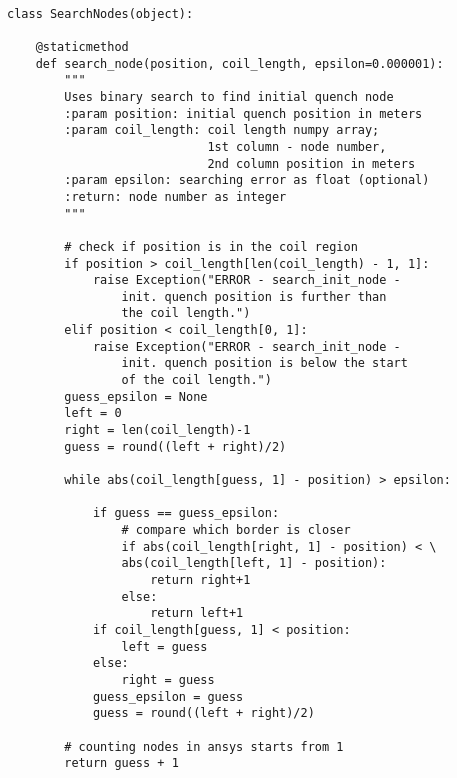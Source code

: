 
\begin{verbatim}
   
class SearchNodes(object):

    @staticmethod
    def search_node(position, coil_length, epsilon=0.000001):
        """
        Uses binary search to find initial quench node
        :param position: initial quench position in meters
        :param coil_length: coil length numpy array; 
                            1st column - node number, 
                            2nd column position in meters
        :param epsilon: searching error as float (optional)
        :return: node number as integer
        """
        
        # check if position is in the coil region
        if position > coil_length[len(coil_length) - 1, 1]:
            raise Exception("ERROR - search_init_node - 
                init. quench position is further than 
                the coil length.")
        elif position < coil_length[0, 1]:
            raise Exception("ERROR - search_init_node - 
                init. quench position is below the start 
                of the coil length.")
        guess_epsilon = None
        left = 0
        right = len(coil_length)-1
        guess = round((left + right)/2)
        
        while abs(coil_length[guess, 1] - position) > epsilon:
        
            if guess == guess_epsilon:
                # compare which border is closer
                if abs(coil_length[right, 1] - position) < \
                abs(coil_length[left, 1] - position):
                    return right+1
                else:
                    return left+1
            if coil_length[guess, 1] < position:
                left = guess
            else:
                right = guess
            guess_epsilon = guess
            guess = round((left + right)/2)

        # counting nodes in ansys starts from 1
        return guess + 1
\end{verbatim}